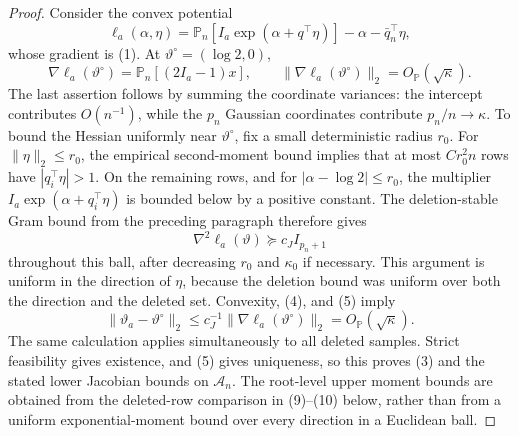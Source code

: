 \documentclass{article}
\begin{document}
\begin{proof}
Consider the convex potential
\[
 \ell_a(\alpha,\eta)=
 \mathbb P_n[I_a\exp(\alpha+q^{\top}\eta)]-\alpha-\bar q_n^{\top}\eta,
\]
whose gradient is (1).  At \(\vartheta^\circ=(\log2,0)\),
\[
 \nabla\ell_a(\vartheta^\circ)
 =\mathbb P_n[(2I_a-1)x],
 \qquad
 \|\nabla\ell_a(\vartheta^\circ)\|_2=O_{\mathbb P}(\sqrt\kappa).
 \tag{4}
\]
The last assertion follows by summing the coordinate variances: the intercept contributes \(O(n^{-1})\), while the \(p_n\) Gaussian coordinates contribute \(p_n/n\to\kappa\).  To bound the Hessian uniformly near \(\vartheta^\circ\), fix a small deterministic radius \(r_0\).  For \(\|\eta\|_2\le r_0\), the empirical second-moment bound implies that at most \(C r_0^2n\) rows have \(|q_i^{\top}\eta|>1\).  On the remaining rows, and for \(|\alpha-\log2|\le r_0\), the multiplier \(I_a\exp(\alpha+q_i^{\top}\eta)\) is bounded below by a positive constant.  The deletion-stable Gram bound from the preceding paragraph therefore gives
\[
 \nabla^2\ell_a(\vartheta)\succeq c_JI_{p_n+1}
 \tag{5}
\]
throughout this ball, after decreasing \(r_0\) and \(\kappa_0\) if necessary.  This argument is uniform in the direction of \(\eta\), because the deletion bound was uniform over both the direction and the deleted set.  Convexity, (4), and (5) imply
\[
 \|\vartheta_a-\vartheta^\circ\|_2
 \le c_J^{-1}\|\nabla\ell_a(\vartheta^\circ)\|_2
 =O_{\mathbb P}(\sqrt\kappa).
\]
The same calculation applies simultaneously to all deleted samples.  Strict feasibility gives existence, and (5) gives uniqueness, so this proves (3) and the stated lower Jacobian bounds on \(\mathcal A_n\).  The root-level upper moment bounds are obtained from the deleted-row comparison in (9)--(10) below, rather than from a uniform exponential-moment bound over every direction in a Euclidean ball.


\end{proof}
\end{document}
